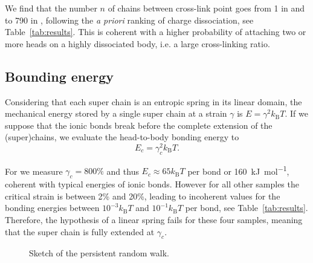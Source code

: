 \documentclass[12pt,a4paper,prl,reprint]{revtex4-1}
\begin{document}
We find that the number $n$ of chains between cross-link point goes from 1 in  and  to 790 in , following the \textit{a priori} ranking of charge dissociation, see Table~\ref{tab:results}. This is coherent with a higher probability of attaching two or more heads on a highly dissociated body, i.e. a large cross-linking ratio.

\subsection{Bounding energy}

Considering that each super chain is an entropic spring in its linear domain, the mechanical energy stored by a single super chain at a strain $\gamma$ is $E = \gamma^2 k_\mathrm{B}T$. If we suppose that the ionic bonds break before the complete extension of the (super)chains, we evaluate the head-to-body bonding energy to
\begin{equation}
E_c = \gamma_c^2 k_\mathrm{B}T.
\end{equation}

For  we measure $\gamma_c = 800\%$ and thus $E_c \approx 65 k_\mathrm{B}T$ per bond or \SI{160}{\kilo\joule\per\mol}, coherent with typical energies of ionic bonds. However for all other samples the critical strain is between 2\% and 20\%, leading to incoherent values for the bonding energies between $10^{-3}k_\mathrm{B}T$ and $10^{-1}k_\mathrm{B}T$ per bond, see Table~\ref{tab:results}. Therefore, the hypothesis of a linear spring fails for these four samples, meaning that the super chain is fully extended at $\gamma_c$.

\begin{figure}
\begin{center}
\end{center}
\caption{Sketch of the persistent random walk.}
\label{fig:persistent}
\end{figure}
\end{document}
